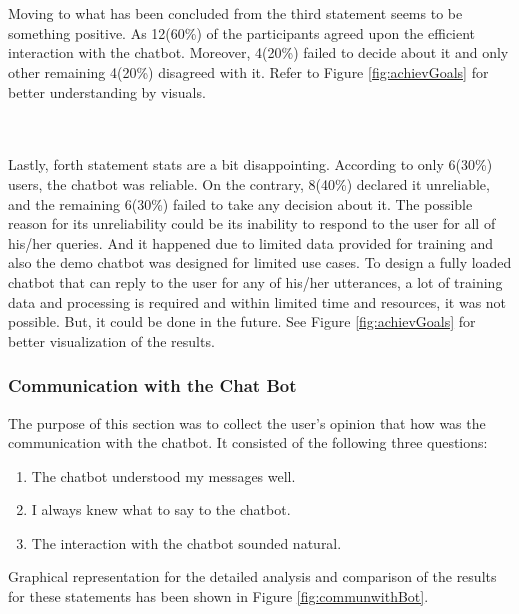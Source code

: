 \\~\\
Moving to what has been concluded from the third statement seems to be something positive. As 12(60\%) of the participants agreed upon the efficient interaction with the chatbot. Moreover, 4(20\%) failed to decide about it and only other remaining 4(20\%) disagreed with it. Refer to Figure \ref{fig:achievGoals} for better understanding by visuals.

\\~\\
Lastly, forth statement stats are a bit disappointing. According to only 6(30\%) users, the chatbot was reliable. On the contrary, 8(40\%) declared it unreliable, and the remaining 6(30\%) failed to take any decision about it. The possible reason for its unreliability could be its inability to respond to the user for all of his/her queries. And it happened due to limited data provided for training and also the demo chatbot was designed for limited use cases. To design a fully loaded chatbot that can reply to the user for any of his/her utterances, a lot of training data and processing is required and within limited time and resources, it was not possible. But, it could be done in the future. See Figure \ref{fig:achievGoals} for better visualization of the results.


\subsubsection*{Communication with the Chat Bot}
The purpose of this section was to collect the user's opinion that how was the communication with the chatbot. It consisted of the following three questions:
\begin{enumerate}
    \item The chatbot understood my messages well.
    \item I always knew what to say to the chatbot.
    \item The interaction with the chatbot sounded natural.
\end{enumerate}
Graphical representation for the detailed analysis and comparison of the results for these statements has been shown in Figure \ref{fig:communwithBot}.

